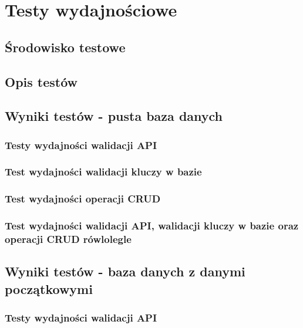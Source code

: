 \chapter{Testy wydajnościowe}
\section{Środowisko testowe}
\section{Opis testów}
\section{Wyniki testów - pusta baza danych}

\subsection{Testy wydajności walidacji API}


\subsection{Test wydajności walidacji kluczy w bazie}
% 

\subsection{Test wydajności operacji CRUD}
% 

\subsection{Test wydajności walidacji API, walidacji kluczy w bazie oraz operacji CRUD rówlolegle }
% 

\section{Wyniki testów - baza danych z danymi początkowymi}
\subsection{Testy wydajności walidacji API}
%  

